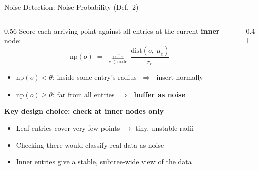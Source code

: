 \documentclass[aspectratio=169]{beamer}
\begin{document}
\begin{frame}{Noise Detection: Noise Probability (Def.\ 2)}
\begin{columns}[T]
  \begin{column}{0.56\textwidth}
    Score each arriving point against all entries at the current \textbf{inner} node:
    \[
      \mathrm{np}(o)
      \;=\;
      \min_{e \in \text{node}}\,\frac{\mathrm{dist}(o,\,\mu_e)}{r_e}
    \]
    \begin{itemize}
      \item $\mathrm{np}(o) < \theta$: inside some entry's radius $\;\Rightarrow\;$ insert normally
      \item $\mathrm{np}(o) \geq \theta$: far from all entries $\;\Rightarrow\;$ \textbf{buffer as noise}
    \end{itemize}
    \vspace{0.3cm}
    \textbf{Key design choice: check at inner nodes only}
    \begin{itemize}
      \item Leaf entries cover very few points $\to$ tiny, unstable radii
      \item Checking there would classify real data as noise
      \item Inner entries give a stable, subtree-wide view of the data
    \end{itemize}
  \end{column}
  \begin{column}{0.41\textwidth}
    \centering
    \vspace{0.5cm}
  \end{column}
\end{columns}
\end{frame}
\end{document}
